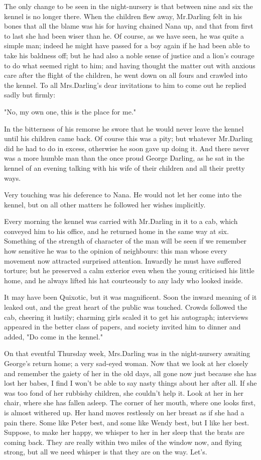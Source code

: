 The only change to be seen in the night-nursery is that
between nine and six the kennel is no longer there.
When the children flew away,
Mr.\@ Darling felt in his bones that all the blame was his for having chained Nana up,
and that from first to last she had been wiser than he.
Of course, as we have seen, he was quite a simple man;
indeed he might have passed for a boy again if he had been able to take his baldness off;
but he had also a noble sense of justice and a lion's courage to do what seemed right to him;
and having thought the matter out with anxious care after the flight of the children,
he went down on all fours and crawled into the kennel.
To all Mrs.\@ Darling's dear invitations to him to come out he replied sadly but firmly:

"No, my own one, this is the place for me."

In the bitterness of his remorse he swore that he would never leave the kennel until his children came back.
Of course this was a pity;
but whatever Mr.\@ Darling did he had to do in excess,
otherwise he soon gave up doing it.
And there never was a more humble man than the once proud George Darling,
as he sat in the kennel of an evening talking with his wife of their children and all their pretty ways.

Very touching was his deference to Nana.
He would not let her come into the kennel,
but on all other matters he followed her wishes implicitly.

Every morning the kennel was carried with Mr.\@ Darling in it to a cab,
which conveyed him to his office, and he returned home in the same way at six.
Something of the strength of character of the man will be seen
if we remember how sensitive he was to the opinion of neighbours:
this man whose every movement now attracted surprised attention.
Inwardly he must have suffered torture;
but he preserved a calm exterior even when the young criticised his little home,
and he always lifted his hat courteously to any lady who looked inside.

It may have been Quixotic, but it was magnificent.
Soon the inward meaning of it leaked out,
and the great heart of the public was touched.
Crowds followed the cab, cheering it lustily;
charming girls scaled it to get his autograph;
interviews appeared in the better class of papers,
and society invited him to dinner and added, "Do come in the kennel."

On that eventful Thursday week,
Mrs.\@ Darling was in the night-nursery awaiting George's return home;
a very sad-eyed woman.
Now that we look at her closely and remember the gaiety of her in the old days,
all gone now just because she has lost her babes,
I find I won't be able to say nasty things about her after all.
If she was too fond of her rubbishy children, she couldn't help it.
Look at her in her chair, where she has fallen asleep.
The corner of her mouth, where one looks first, is almost withered up.
Her hand moves restlessly on her breast as if she had a pain there.
Some like Peter best, and some like Wendy best, but I like her best.
Suppose, to make her happy, we whisper to her in her sleep that the brats are coming back.
They are really within two miles of the window now, and flying strong,
but all we need whisper is that they are on the way.
Let's.

